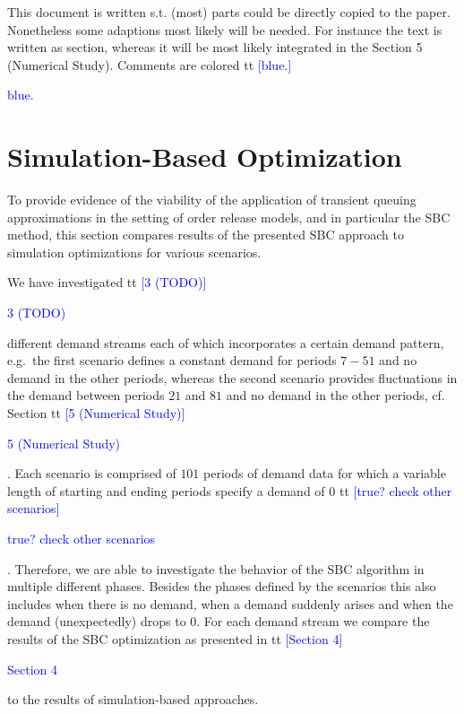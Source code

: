 \documentclass{article}
\newcommand{\MScolor}{blue}
\newcommand\MS[2][r]{\ifx t#1 \textcolor{\MScolor}{[#2]}
  \else \begin{center}\textcolor{\MScolor}{#2} \end{center} \fi}
\begin{document}
This document is written s.t. (most) parts could be directly copied to the paper. Nonetheless some
adaptions most likely will be needed. For instance the text is written as section, whereas it will
be most likely integrated in the Section 5 (Numerical Study). Comments are colored \MS[t]{blue.}


\section{Simulation-Based Optimization}

To provide evidence of the viability of the application of transient queuing approximations in the
setting of order release models, and in particular the SBC method, this section compares results of
the presented SBC approach to simulation optimizations for various scenarios.


We have investigated \MS[t]{3 (TODO)} different demand streams each of which incorporates a certain
demand pattern, e.g.~the first scenario defines a constant demand for periods $7-51$ and no demand
in the other periods, whereas the second scenario provides fluctuations in the demand between
periods $21$ and $81$ and no demand in the other periods, cf. Section \MS[t]{5 (Numerical Study)}.
Each scenario is comprised of $101$ periods of demand data for which a variable length of starting
and ending periods specify a demand of $0$ \MS[t]{true? check other scenarios}. Therefore, we are
able to investigate the behavior of the SBC algorithm in multiple different phases. Besides the
phases defined by the scenarios this also includes when there is no demand, when a demand suddenly
arises and when the demand (unexpectedly) drops to $0$.
%
For each demand stream we compare the results of the SBC optimization as
presented in \MS[t]{Section 4} to the results of simulation-based approaches.
\end{document}
